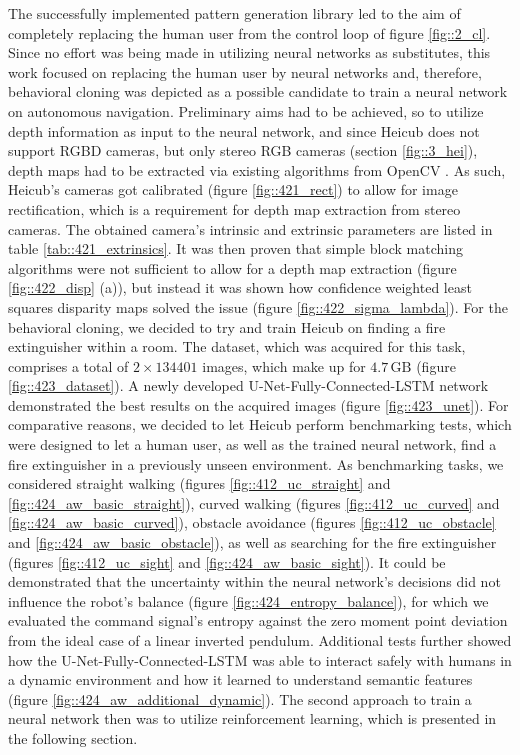 The successfully implemented pattern generation library led to the aim of completely replacing the human user from the control loop of figure \ref{fig::2_cl}. Since no effort was being made in utilizing neural networks as substitutes, this work focused on replacing the human user by neural networks and, therefore, behavioral cloning was depicted as a possible candidate to train a neural network on autonomous navigation. Preliminary aims had to be achieved, so to utilize depth information as input to the neural network, and since Heicub does not support RGBD cameras, but only stereo RGB cameras (section \ref{fig::3_hei}), depth maps had to be extracted via existing algorithms from OpenCV \cite{opencv_library}. As such, Heicub's cameras got calibrated (figure \ref{fig::421_rect}) to allow for image rectification, which is a requirement for depth map extraction from stereo cameras. The obtained camera's intrinsic and extrinsic parameters are listed in table \ref{tab::421_extrinsics}. It was then proven that simple block matching algorithms were not sufficient to allow for a depth map extraction (figure \ref{fig::422_disp} (a)), but instead it was shown how confidence weighted least squares disparity maps solved the issue (figure \ref{fig::422_sigma_lambda}). For the behavioral cloning, we decided to try and train Heicub on finding a fire extinguisher within a room. The dataset, which was acquired for this task, comprises a total of $2\times134401$ images, which make up for $4.7\,\text{GB}$ (figure \ref{fig::423_dataset}). A newly developed U-Net-Fully-Connected-LSTM network demonstrated the best results on the acquired images (figure \ref{fig::423_unet}). For comparative reasons, we decided to let Heicub perform benchmarking tests, which were designed to let a human user, as well as the trained neural network, find a fire extinguisher in a previously unseen environment. As benchmarking tasks, we considered straight walking (figures \ref{fig::412_uc_straight} and \ref{fig::424_aw_basic_straight}), curved walking (figures \ref{fig::412_uc_curved} and \ref{fig::424_aw_basic_curved}), obstacle avoidance (figures \ref{fig::412_uc_obstacle} and \ref{fig::424_aw_basic_obstacle}), as well as searching for the fire extinguisher (figures \ref{fig::412_uc_sight} and \ref{fig::424_aw_basic_sight}). It could be demonstrated that the uncertainty within the neural network's decisions did not influence the robot's balance (figure \ref{fig::424_entropy_balance}), for which we evaluated the command signal's entropy against the zero moment point deviation from the ideal case of a linear inverted pendulum. Additional tests further showed how the U-Net-Fully-Connected-LSTM was able to interact safely with humans in a dynamic environment and how it learned to understand semantic features (figure \ref{fig::424_aw_additional_dynamic}). The second approach to train a neural network then was to utilize reinforcement learning, which is presented in the following section.\\\\
